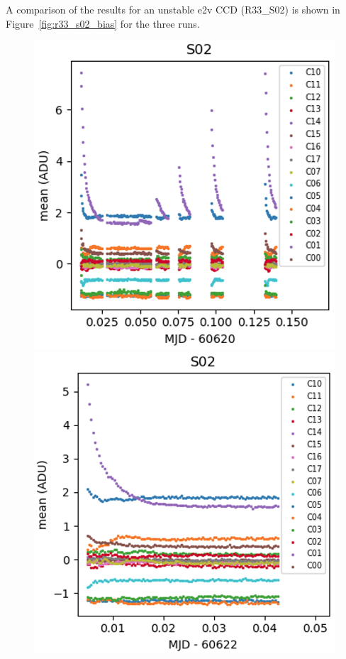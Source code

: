 A comparison of the results for an unstable e2v CCD (R33\_S02) is shown in Figure~\ref{fig:r33_s02_bias} for the
three runs.

\begin{figure}[htbp]
\centering
\begin{minipage}[b]{0.45\textwidth}
    \centering
    \includegraphics[width=\textwidth]{figures/E2136_R33_S02.png}
\end{minipage}
\hspace{0.05\textwidth}
\begin{minipage}[b]{0.45\textwidth}
    \centering
    \includegraphics[width=\textwidth]{figures/E2236_R33_S02.png}
\end{minipage}


\end{figure}
